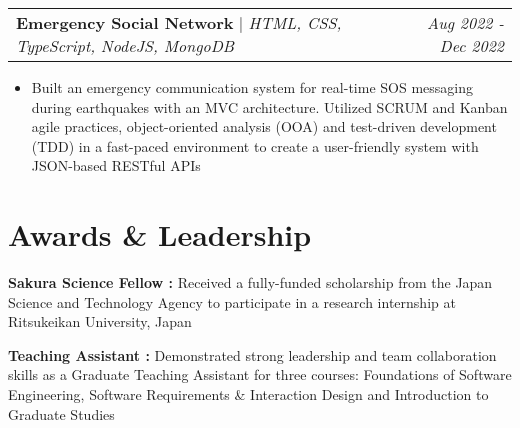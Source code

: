 \documentclass[letterpaper]{article}
\makeatletter
\newcommand{\resumeItemWithoutTitle}[1]{
  \item\small{
    {#1 \vspace{-2pt}}
  }
}
\newcommand{\shortSection}[1]{
    \vspace{-6pt}
    \section{#1}
}
\newcommand{\projectHeading}[3]{
  \begin{tabular*}{\textwidth}{l@{\extracolsep{\fill}}r}
        \textbf{#1} 
        \hspace{-2pt} $\vert$ \hspace{-2pt} \small{\textit{#2}} 
        & 
        \textit{#3} \\
    \end{tabular*}\vspace{-2pt}
}
\newcommand*{\skill}[2]{
  \textbf{#1 : }#2 \\
  \vspace{1pt}
}
\newcommand{\resumeItemListStart}{\begin{itemize}}
\newcommand{\resumeItemListEnd}{\end{itemize}}
\makeatother
\begin{document}
\vspace{3pt}
\projectHeading {Emergency Social Network}{HTML, CSS, TypeScript, NodeJS, MongoDB}{Aug 2022 - Dec 2022}
\resumeItemListStart
\resumeItemWithoutTitle{Built an emergency communication system for real-time SOS messaging during earthquakes with an MVC architecture. Utilized SCRUM and Kanban agile practices, object-oriented analysis (OOA) and test-driven development (TDD) in a fast-paced environment to create a user-friendly system with JSON-based RESTful APIs}
\resumeItemListEnd




\shortSection{Awards \& Leadership}
\skill{Sakura Science Fellow}{Received a fully-funded scholarship from the Japan Science and Technology Agency to participate in a research internship at Ritsukeikan University, Japan}
\skill{Teaching Assistant}{Demonstrated strong leadership and team collaboration skills as a Graduate Teaching Assistant for three courses: Foundations of Software Engineering, Software Requirements \& Interaction Design and Introduction to Graduate Studies}
\end{document}
